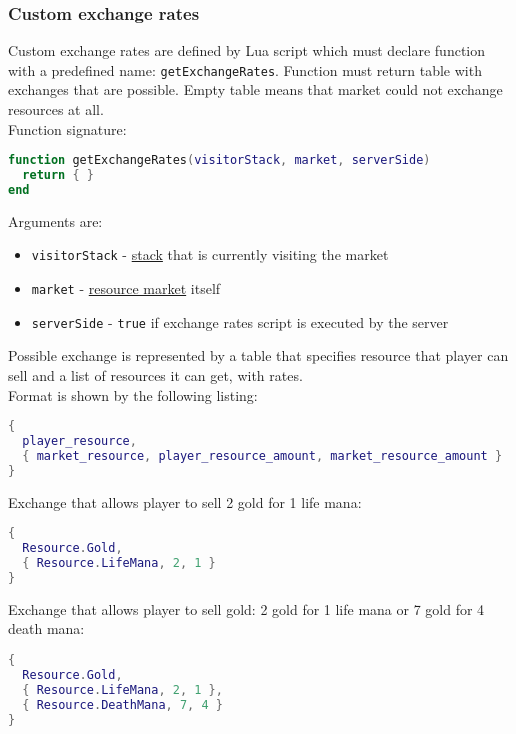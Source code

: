 \subsubsection{Custom exchange rates}
Custom exchange rates are defined by Lua script which must declare function with a predefined name:
\texttt{getExchangeRates}.
Function must return table with exchanges that are possible. Empty table means that market could not exchange resources at all.\\
Function signature:
\begin{center}
\begin{lstlisting}[language=Lua]
function getExchangeRates(visitorStack, market, serverSide)
  return { }
end
\end{lstlisting}
\end{center}
Arguments are:
\begin{itemize}
\item \texttt{visitorStack} - \hyperref[Stack]{stack} that is currently visiting the market
\item \texttt{market} - \hyperref[ResourceMarket]{resource market} itself
\item \texttt{serverSide} - \texttt{true} if exchange rates script is executed by the server
\end{itemize}
Possible exchange is represented by a table that specifies resource that player can sell and a list of resources it can get, with rates.\\
Format is shown by the following listing:
\begin{center}
\begin{lstlisting}[language=Lua]
{
  player_resource,
  { market_resource, player_resource_amount, market_resource_amount }
}
\end{lstlisting}
\end{center}
Exchange that allows player to sell 2 gold for 1 life mana:
\begin{center}
\begin{lstlisting}[language=Lua]
{
  Resource.Gold,
  { Resource.LifeMana, 2, 1 }
}
\end{lstlisting}
\end{center}
Exchange that allows player to sell gold: 2 gold for 1 life mana or 7 gold for 4 death mana:
\begin{center}
\begin{lstlisting}[language=Lua]
{
  Resource.Gold,
  { Resource.LifeMana, 2, 1 },
  { Resource.DeathMana, 7, 4 }
}
\end{lstlisting}
\end{center}
